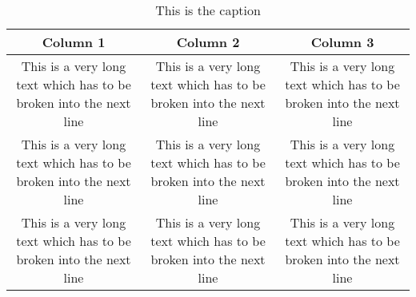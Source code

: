 \documentclass{article}
\begin{document}
 

\begin{table}[!ht]
   \setlength\extrarowheight{2pt} %
   \begin{tabularx}{\textwidth}{|C|C|C|}
      \hline
      \textbf{Column 1} & \textbf{Column 2} & \textbf{Column 3}  \\\hline
      This is a very long text which has to be broken into the next line & This is a very long text which has to be broken into the next line & This is a very long text which has to be broken into the next line  \\
      \hline
      This is a very long text which has to be broken into the next line & This is a very long text which has to be broken into the next line & This is a very long text which has to be broken into the next line  \\
      \hline
      This is a very long text which has to be broken into the next line & This is a very long text which has to be broken into the next line & This is a very long text which has to be broken into the next line  \\
      \hline
   \end{tabularx}
   \caption{This is the caption}
\end{table}
\end{document}
